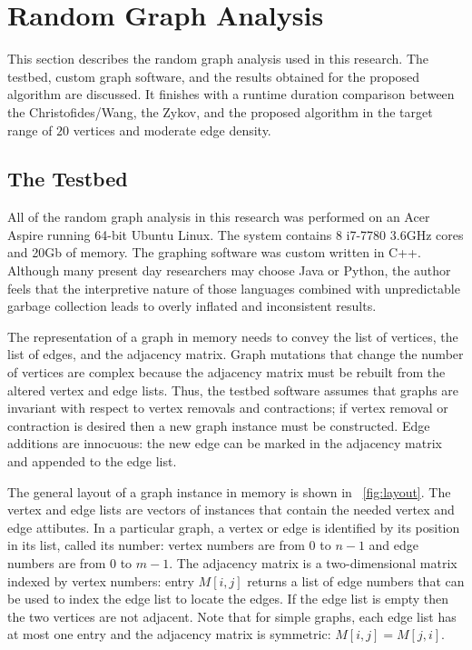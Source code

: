 \section{Random Graph Analysis}\label{sec:random}

This section describes the random graph analysis used in this research.  The testbed, custom graph software, and
the results obtained for the proposed algorithm are discussed.  It finishes with a runtime duration comparison
between the Christofides/Wang, the Zykov, and the proposed algorithm in the target range of \(20\) vertices and
moderate edge density.

\subsection{The Testbed}\label{sec:sub:testbed}

All of the random graph analysis in this research was performed on an Acer Aspire running 64-bit Ubuntu Linux.  The
system contains 8 i7-7780 3.6GHz cores and 20Gb of memory.  The graphing software was custom written in C++.
Although many present day researchers may choose Java or Python, the author feels that the interpretive nature of
those languages combined with unpredictable garbage collection leads to overly inflated and inconsistent results.

The representation of a graph in memory needs to convey the list of vertices, the list of edges, and the adjacency
matrix.  Graph mutations that change the number of vertices are complex because the adjacency matrix must be
rebuilt from the altered vertex and edge lists.  Thus, the testbed software assumes that graphs are invariant with
respect to vertex removals and contractions; if vertex removal or contraction is desired then a new graph instance
must be constructed.  Edge additions are innocuous: the new edge can be marked in the adjacency matrix and
appended to the edge list.

The general layout of a graph instance in memory is shown in \figurename~\ref{fig:layout}.  The vertex and edge
lists are vectors of instances that contain the needed vertex and edge attibutes.  In a particular graph, a vertex
or edge is identified by its position in its list, called its number: vertex numbers are from \(0\) to \(n-1\) and
edge numbers are from \(0\) to \(m-1\).  The adjacency matrix is a two-dimensional matrix indexed by vertex
numbers: entry \(M[i,j]\) returns a list of edge numbers that can be used to index the edge list to locate the
edges.  If the edge list is empty then the two vertices are not adjacent.  Note that for simple graphs, each edge
list has at most one entry and the adjacency matrix is symmetric: \(M[i,j]=M[j,i]\).

